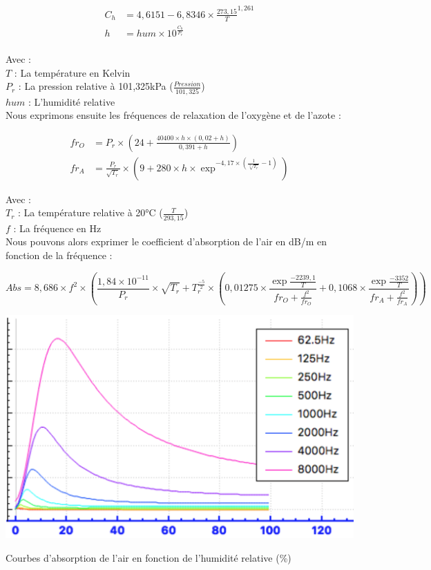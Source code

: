 \begin{align}
	C_h & = 4,6151 - 6,8346 \times \frac{273,15}{T}^{1,261} \\
	h & = hum \times 10^{\frac{C_h}{P_r}} \\ 
\end{align}

Avec : \\
$T$ : La température en Kelvin \\
$P_r$ : La pression relative à 101,325kPa ($\frac{Pression}{101,325}$) \\
$hum$ : L'humidité relative \\

Nous exprimons ensuite les fréquences de relaxation de l'oxygène et de l'azote \cite[6.2, eq. 3 et 4]{iso}:

\begin{align}
	fr_O & =  P_r \times (24 + \frac{40400 \times h \times (0,02 + h)}{0,391 + h})  \\
	fr_A & =  \frac{P_r}{\sqrt{T_r}} \times (9 + 280 \times h \times \exp^{-4,17 \times (\frac{1}{\sqrt[3]{T_r}} - 1)})
\end{align}


Avec : \\
$T_r$ : La température relative à 20°C ($\frac{T}{293,15}$) \\
$f$ : La fréquence en Hz \\

Nous pouvons alors exprimer le coefficient d'absorption de l'air en dB/m en fonction de la fréquence  \cite[6.2, eq. 5]{iso} :

\begin{equation}
	Abs = 8,686 \times f^2 \times (\frac{1,84 \times 10^{-11}}{P_r} \times \sqrt{T_r} + T_r^{\frac{-5}{2}} \times (0,01275 \times \frac{\exp{\frac{-2239,1}{T}}}{fr_O + \frac{f^2}{fr_O}} + 0,1068 \times  \frac{\exp{\frac{-3352}{T}}}{fr_A + \frac{f^2}{fr_A}}))
\end{equation}

\begin{figureth}
	\includegraphics[width=0.8\linewidth]{images/courbesAbs}
	\caption{Courbes d'absorption de l'air en fonction de l'humidité relative (\%)}
	\label{courbesAbs}
\end{figureth}

